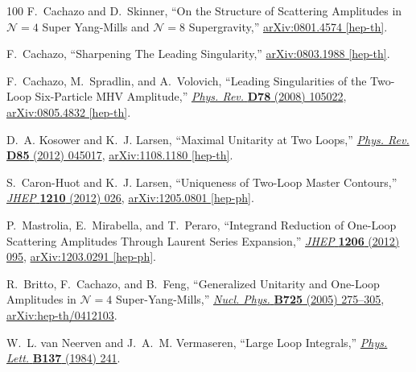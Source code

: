 \documentclass[12pt,hyperref,compress]{JHEP3}
\begin{document}
\begin{thebibliography}{100}
F.~Cachazo and D.~Skinner, ``{On the Structure of Scattering Amplitudes in
  $\mathcal{N}\!=\!4$ Super Yang-Mills and $\mathcal{N}\!=\!8$ Supergravity},''
\href{http://arxiv.org/abs/0801.4574}{{ arXiv:0801.4574 [hep-th]}}.

F.~Cachazo, ``{Sharpening The Leading Singularity},''
\href{http://arxiv.org/abs/0803.1988}{{ arXiv:0803.1988 [hep-th]}}.

F.~Cachazo, M.~Spradlin, and A.~Volovich, ``{Leading Singularities of the
  Two-Loop Six-Particle MHV Amplitude},''
  \href{http://dx.doi.org/10.1103/PhysRevD.78.105022}{{\em Phys. Rev.} {\bf
  D78} (2008)  105022},
\href{http://arxiv.org/abs/0805.4832}{{ arXiv:0805.4832 [hep-th]}}.

D.~A. Kosower and K.~J. Larsen, ``{Maximal Unitarity at Two Loops},''
  \href{http://dx.doi.org/10.1103/PhysRevD.85.045017}{{\em Phys. Rev.} {\bf
  D85} (2012)  045017},
\href{http://arxiv.org/abs/1108.1180}{{ arXiv:1108.1180 [hep-th]}}.

S.~Caron-Huot and K.~J. Larsen, ``{Uniqueness of Two-Loop Master Contours},''
  \href{http://dx.doi.org/10.1007/JHEP10(2012)026}{{\em JHEP} {\bf 1210} (2012)
   026},
\href{http://arxiv.org/abs/1205.0801}{{ arXiv:1205.0801 [hep-ph]}}.

P.~Mastrolia, E.~Mirabella, and T.~Peraro, ``{Integrand Reduction of One-Loop
  Scattering Amplitudes Through Laurent Series Expansion},''
  \href{http://dx.doi.org/10.1007/JHEP06(2012)095}{{\em JHEP} {\bf 1206} (2012)
   095},
\href{http://arxiv.org/abs/1203.0291}{{ arXiv:1203.0291 [hep-ph]}}.

R.~Britto, F.~Cachazo, and B.~Feng, ``{Generalized Unitarity and One-Loop
  Amplitudes in $\mathcal{N}\!=\!4$ Super-Yang-Mills},''
  \href{http://dx.doi.org/10.1016/j.nuclphysb.2005.07.014}{{\em Nucl. Phys.}
  {\bf B725} (2005)  275--305},
\href{http://arxiv.org/abs/hep-th/0412103}{{ arXiv:hep-th/0412103}}.

W.~L. van Neerven and J.~A.~M. Vermaseren, ``{Large Loop Integrals},''
\href{http://dx.doi.org/10.1016/0370-2693(84)90237-5}{{\em Phys. Lett.} {\bf
  B137} (1984)  241}.


\end{thebibliography}
\end{document}
